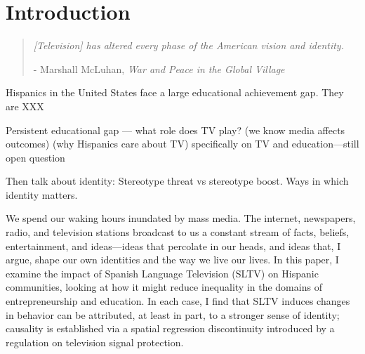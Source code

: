 \documentclass[11pt]{article}
\begin{document}
\newsavebox{\tablebox} \newlength{\tableboxwidth}

\setlength{\baselineskip}{22pt}

\renewcommand{\thefootnote}{\fnsymbol{footnote}}


\thispagestyle{empty}

\newpage 
\renewcommand{\thefootnote}{\arabic{footnote}}

\pagebreak 
\setcounter{page}{0}


\onehalfspacing


\newpage

\setcounter{page}{1}
\section{Introduction}

\begin{quotation}
\textit{[Television] has altered every phase of the American vision and identity. }
\begin{flushright} - Marshall McLuhan, \textit{War and Peace in the Global Village}\end{flushright}
\end{quotation}

Hispanics in the United States face a large educational achievement gap. They are XXX



Persistent educational gap --- what role does TV play?  (we know media affects outcomes)  (why Hispanics care about TV) specifically on TV and education—still open question

Then talk about identity: Stereotype threat vs stereotype boost. Ways in which identity matters. 








We spend our waking hours inundated by mass media. The internet, newspapers, radio, and television stations broadcast to us a constant stream of facts, beliefs, entertainment, and ideas---ideas that percolate in our heads, and ideas that, I argue, shape our own identities and the way we live our lives. In this paper, I examine the impact of Spanish Language Television (SLTV) on Hispanic communities, looking at how it might reduce inequality in the domains of entrepreneurship and education. In each case, I find that SLTV induces changes in behavior can be attributed, at least in part, to a stronger sense of identity; causality is established via a spatial regression discontinuity introduced by a regulation on television signal protection.
\end{document}

